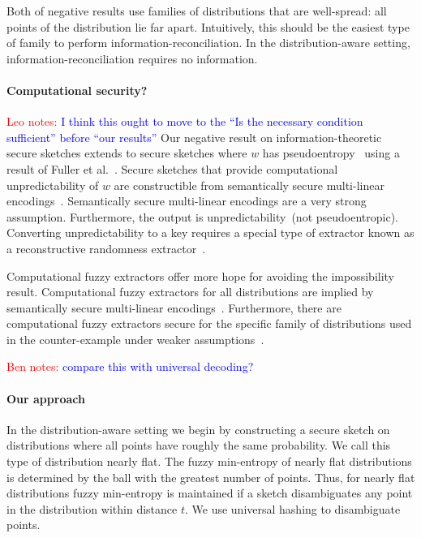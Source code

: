 \documentclass[11pt]{article}
\newcommand{\authnote}[2]{{\textcolor{red}{\textsf{#1 notes: }\textcolor{blue}{ #2}}\marginpar{\textcolor{red}{\textbf{!!!!!}}}}}
\newcommand{\authnote}[2]{}
\newcommand{\bnote}[1]{{\authnote{Ben}{#1}}}
\newcommand{\lnote}[1]{{\authnote{Leo}{#1}}}
\begin{document}
Both of negative results use families of distributions that are well-spread: all points of the distribution lie far apart.  Intuitively, this should be the easiest type of family to perform information-reconciliation.  In the distribution-aware setting, information-reconciliation requires no information.

\paragraph{Computational security?} \lnote{I think this ought to move to the ``Is the necessary condition sufficient'' before ``our results''}
Our negative result on information-theoretic secure sketches extends to secure sketches where $w$ has pseudoentropy~\cite{DBLP:journals/siamcomp/HastadILL99} using a result of Fuller et al.~\cite{fuller2013computational}.  Secure sketches that provide computational unpredictability of $w$ are constructible from semantically secure multi-linear encodings~\cite{BitanskyCKP14}.  Semantically secure multi-linear encodings are a very strong assumption.  Furthermore, the output is unpredictability~(not pseudoentropic).  Converting unpredictability to a key requires a special type of extractor known as a reconstructive randomness extractor~\cite{barak-computational, DBLP:conf/eurocrypt/HsiaoLR07}.  

Computational fuzzy extractors offer more hope for avoiding the impossibility result.  Computational fuzzy extractors for all distributions are implied by semantically secure multi-linear encodings~\cite{BitanskyCKP14}.  Furthermore, there are computational fuzzy extractors secure for the specific family of distributions used in the counter-example under weaker assumptions~\cite[Construction 5.3]{canetti2014key}.

\bnote{compare this with universal decoding?}

\paragraph{Our approach} In the distribution-aware setting we begin by constructing a secure sketch on distributions where all points have roughly the same probability.  We call this type of distribution nearly flat.  The fuzzy min-entropy of nearly flat distributions is determined by the ball with the greatest number of points.  Thus, for nearly flat distributions fuzzy min-entropy is maintained if a sketch disambiguates any point in the distribution within distance $t$.  We use universal hashing to disambiguate points.
\end{document}
